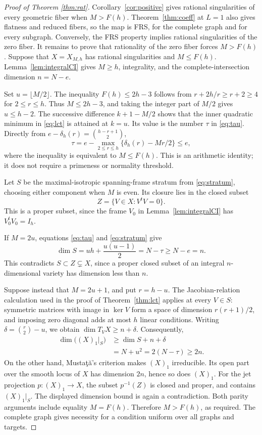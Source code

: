 \documentclass[11pt]{article}
\numberwithin{equation}{section}
\theoremstyle{remark}
\begin{document}
\begin{proof}[Proof of Theorem \ref{thm:rat}]
Corollary~\ref{cor:positive} gives rational singularities of every
geometric fiber when $M>F(h)$. Theorem~\ref{thm:coeff} at $L=1$
also gives flatness and reduced fibers, so the map is FRS, for the
complete graph and for every subgraph. Conversely, the FRS property
implies rational singularities of the zero fiber. It remains to prove
that rationality of the zero fiber forces $M>F(h)$. Suppose
that $X=X_{M,h}$ has rational singularities and $M\le F(h)$.
Lemma~\ref{lem:integralCI} gives $M\ge h$, integrality, and the
complete-intersection dimension $n=N-e$.

Set $u=\lfloor M/2\rfloor$. The inequality $F(h)\le2h-3$ follows
from $r+2h/r\ge r+2\ge4$ for $2\le r\le h$. Thus
$M\le2h-3$, and taking the integer part of $M/2$ gives $u\le h-2$.
The successive difference $k+1-M/2$ shows that the inner quadratic
minimum in \eqref{eq:lct} is attained at $k=u$. Its value is the
number $\tau$ in \eqref{eq:tau}. Directly from
$e-\delta_h(r)=\binom{h-r+1}{2}$,
\begin{equation}\label{eq:necessitytau}
 \tau=e-\max_{2\le r\le h}\{\delta_h(r)-Mr/2\}\le e,
\end{equation}
where the inequality is equivalent to $M\le F(h)$.
This is an arithmetic identity; it does not require a primeness
or normality threshold.

Let $S$ be the maximal-isotropic spanning-frame stratum from
\eqref{eq:stratum}, choosing either component when $M$ is even.
Its closure lies in the closed subset
\[
 Z=\{V\in X:V^tV=0\}.
\]
This is a proper subset, since the frame $V_0$ in
Lemma~\ref{lem:integralCI} has $V_0^tV_0=I_h$.

If $M=2u$, equations \eqref{eq:tau} and \eqref{eq:stratum} give
\[
 \dim S=uh+\frac{u(u-1)}2=N-\tau\ge N-e=n.
\]
This contradicts $S\subset Z\subsetneq X$, since a proper closed
subset of an integral $n$-dimensional variety has dimension less
than $n$.

Suppose instead that $M=2u+1$, and put $r=h-u$.
The Jacobian-relation calculation used in the proof of
Theorem~\ref{thm:lct} applies at every $V\in S$: symmetric matrices
with image in $\ker V$ form a space of dimension $r(r+1)/2$,
and imposing zero diagonal adds at most $h$ linear conditions.
Writing $\delta=\binom r2-u$, we obtain
$\dim T_VX\ge n+\delta$. Consequently,
\begin{align*}
 \dim\bigl((X)_1|_S\bigr)
 &\ge\dim S+n+\delta\\
 &=N+u^2=2(N-\tau)\ge2n.
\end{align*}
On the other hand, Musta\c{t}\u{a}'s criterion
\cite[Theorem 0.1]{Mjets} makes $(X)_1$ irreducible. Its open part
over the smooth locus of $X$ has dimension $2n$, hence so does
$(X)_1$. For the jet projection $p:(X)_1\to X$, the subset
$p^{-1}(Z)$ is closed and proper, and contains $(X)_1|_S$.
The displayed dimension bound is again a contradiction.
Both parity arguments include equality $M=F(h)$. Therefore
$M>F(h)$, as required. The complete graph gives necessity for
a condition uniform over all graphs and targets.
\end{proof}
\end{document}
